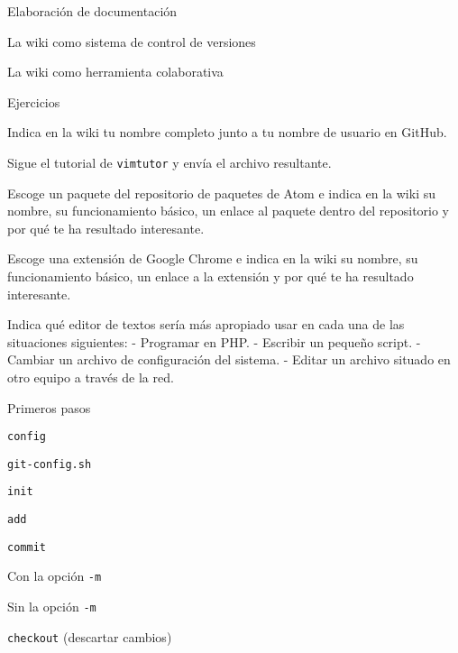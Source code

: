 \begin{longenum}
\begin{longenum}
\begin{longenum}
            \begin{longenum}
                \item Elaboración de documentación
                \item La wiki como sistema de control de versiones
                \item La wiki como herramienta colaborativa
            \end{longenum}
            \item Ejercicios
            \begin{longenum}
                \item Indica en la wiki tu nombre completo junto a tu nombre de usuario en GitHub.
                \item Sigue el tutorial de \texttt{vimtutor} y envía el archivo resultante.
                \item Escoge un paquete del repositorio de paquetes de Atom e indica en la wiki su nombre, su funcionamiento básico, un enlace al paquete dentro del repositorio y por qué te ha resultado interesante.
                \item Escoge una extensión de Google Chrome e indica en la wiki su nombre, su funcionamiento básico, un enlace a la extensión y por qué te ha resultado interesante.
                \item Indica qué editor de textos sería más apropiado usar en cada una de las situaciones siguientes:
  - Programar en PHP.
  - Escribir un pequeño script.
  - Cambiar un archivo de configuración del sistema.
  - Editar un archivo situado en otro equipo a través de la red.
            \end{longenum}
        \end{longenum}
        \item Primeros pasos
        \begin{longenum}
            \item \texttt{config}
            \item \texttt{git-config.sh}
            \item \texttt{init}
            \item \texttt{add}
            \item \texttt{commit}
            \begin{longenum}
                \item Con la opción \texttt{-m}
                \item Sin la opción \texttt{-m}
            \end{longenum}
            \item \texttt{checkout} (descartar cambios)

\end{longenum}
\end{longenum}
\end{longenum}
